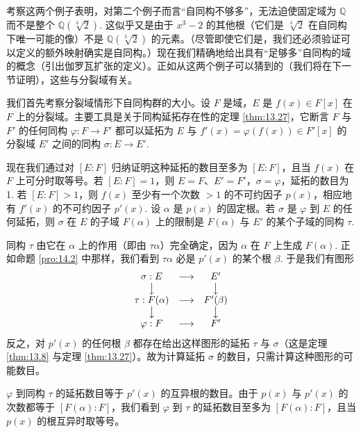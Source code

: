 考察这两个例子表明，对第二个例子而言“自同构不够多”，无法迫使固定域为 \(\mathbb{Q}\) 而不是整个 \(\mathbb{Q}(\sqrt[3]{2})\). 这似乎又是由于 \(x^3-2\) 的其他根（它们是 \(\sqrt[3]{2}\) 在自同构下唯一可能的像）不是 \(\mathbb{Q}(\sqrt[3]{2})\) 的元素。（尽管即使它们是，我们还必须验证可以定义的额外映射确实是自同构。）现在我们精确地给出具有“足够多”自同构的域的概念（引出伽罗瓦扩张的定义）。正如从这两个例子可以猜到的（我们将在下一节证明），这些与分裂域有关。

我们首先考察分裂域情形下自同构群的大小。设 \(F\) 是域，\(E\) 是 \(f(x) \in F[x]\) 在 \(F\) 上的分裂域。主要工具是关于同构延拓存在性的定理 \ref{thm:13.27}，它断言 \(F\) 与 \(F'\) 的任何同构 \(\varphi : F \to F'\) 都可以延拓为 \(E\) 与 \(f'(x) = \varphi(f(x)) \in F'[x]\) 的分裂域 \(E'\) 之间的同构 \(\sigma : E \to E'\).

现在我们通过对 \([E:F]\) 归纳证明这种延拓的数目至多为 \([E:F]\)，且当 \(f(x)\) 在 \(F\) 上可分时取等号。若 \([E:F] = 1\)，则 \(E = F\)、\(E' = F'\)，\(\sigma = \varphi\)，延拓的数目为 1. 若 \([E:F] > 1\)，则 \(f(x)\) 至少有一个次数 \(> 1\) 的不可约因子 \(p(x)\)，相应地有 \(f'(x)\) 的不可约因子 \(p'(x)\). 设 \(\alpha\) 是 \(p(x)\) 的固定根。若 \(\sigma\) 是 \(\varphi\) 到 \(E\) 的任何延拓，则 \(\sigma\) 在 \(E\) 的子域 \(F(\alpha)\) 上的限制是 \(F(\alpha)\) 与 \(E'\) 的某个子域的同构 \(\tau\).

同构 \(\tau\) 由它在 \(\alpha\) 上的作用（即由 \(\tau\alpha\)）完全确定，因为 \(\alpha\) 在 \(F\) 上生成 \(F(\alpha)\). 正如命题 \ref{pro:14.2} 中那样，我们看到 \(\tau\alpha\) 必是 \(p'(x)\) 的某个根 \(\beta\). 于是我们有图形
\[
\begin{array}{ccc}
\sigma : E & \longrightarrow & E'\\
\big\downarrow & & \big\downarrow\\
\tau : F(\alpha) & \longrightarrow & F'(\beta)\\
\big\downarrow & & \big\downarrow\\
\varphi : F & \longrightarrow & F'
\end{array}
\]
反之，对 \(p'(x)\) 的任何根 \(\beta\) 都存在给出这样图形的延拓 \(\tau\) 与 \(\sigma\)（这是定理 \ref{thm:13.8} 与定理 \ref{thm:13.27}）。故为计算延拓 \(\sigma\) 的数目，只需计算这种图形的可能数目。

\(\varphi\) 到同构 \(\tau\) 的延拓数目等于 \(p'(x)\) 的互异根的数目。由于 \(p(x)\) 与 \(p'(x)\) 的次数都等于 \([F(\alpha):F]\)，我们看到 \(\varphi\) 到 \(\tau\) 的延拓数目至多为 \([F(\alpha):F]\)，且当 \(p(x)\) 的根互异时取等号。

